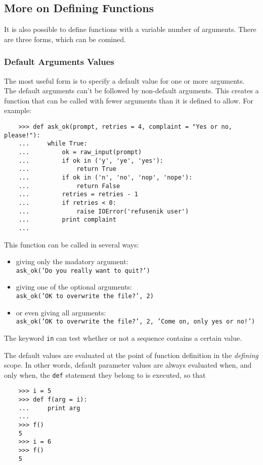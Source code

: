 \documentclass[UTF8]{article}
\begin{document}
\subsection{More on Defining Functions}
It is also possible to define functions with a variable number of arguments. There are three forms,
which can be comined.
\subsubsection{Default Arguments Values}
The most useful form is to specify a default value for one or more arguments. The default arguments
can't be followed by non-default arguments. This creates a function that can be called with fewer
arguments than it is defined to allow. For example:
\begin{verbatim}
    >>> def ask_ok(prompt, retries = 4, complaint = "Yes or no, please!"):
    ...     while True:
    ...         ok = raw_input(prompt)
    ...         if ok in ('y', 'ye', 'yes'):
    ...             return True
    ...         if ok in ('n', 'no', 'nop', 'nope'):
    ...             return False
    ...         retries = retries - 1
    ...         if retries < 0:
    ...             raise IOError('refusenik user')
    ...         print complaint
    ...
\end{verbatim}
This function can be called in several ways:
\begin{itemize}
    \item giving only the madatory argument: \\
    \texttt{ask\_ok('Do you really want to quit?')}
    \item giving one of the optional arguments: \\
    \texttt{ask\_ok('OK to overwrite the file?', 2)}
    \item or even giving all arguments: \\
    \texttt{ask\_ok('OK to overwrite the file?', 2, 'Come on, only yes or no!')}
\end{itemize}

The keyword \texttt{in} can test whether or not a sequence contains a certain value.

The default values are evaluated at the point of function definition in the \emph{defining} scope.
In other words, default parameter values are always evaluated when, and only when, the \texttt{def}
statement they belong to is executed, so that
\begin{verbatim}
    >>> i = 5
    >>> def f(arg = i):
    ...     print arg
    ...
    >>> f()
    5
    >>> i = 6
    >>> f()
    5
\end{verbatim}
\end{document}
